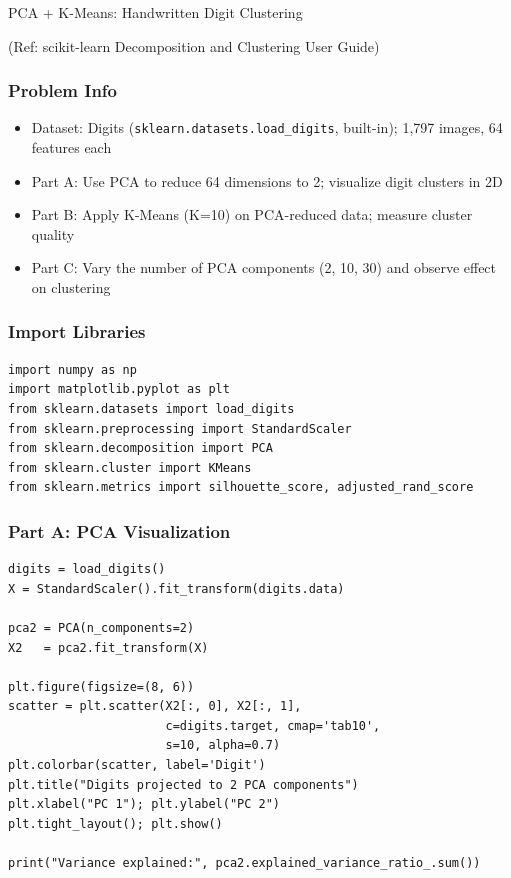 \begin{frame}[fragile]\frametitle{}
\begin{center}
{\Large PCA + K-Means: Handwritten Digit Clustering}

{\tiny (Ref: scikit-learn Decomposition and Clustering User Guide)}
\end{center}
\end{frame}

\begin{frame}[fragile]\frametitle{Problem Info}
\begin{itemize}
\item Dataset: Digits (\texttt{sklearn.datasets.load\_digits}, built-in); 1,797 images, 64 features each
\item Part A: Use PCA to reduce 64 dimensions to 2; visualize digit clusters in 2D
\item Part B: Apply K-Means (K=10) on PCA-reduced data; measure cluster quality
\item Part C: Vary the number of PCA components (2, 10, 30) and observe effect on clustering
\end{itemize}
\end{frame}

\begin{frame}[fragile]\frametitle{Import Libraries}
\begin{lstlisting}
import numpy as np
import matplotlib.pyplot as plt
from sklearn.datasets import load_digits
from sklearn.preprocessing import StandardScaler
from sklearn.decomposition import PCA
from sklearn.cluster import KMeans
from sklearn.metrics import silhouette_score, adjusted_rand_score
\end{lstlisting}
\end{frame}

\begin{frame}[fragile]\frametitle{Part A: PCA Visualization}
\begin{lstlisting}
digits = load_digits()
X = StandardScaler().fit_transform(digits.data)

pca2 = PCA(n_components=2)
X2   = pca2.fit_transform(X)

plt.figure(figsize=(8, 6))
scatter = plt.scatter(X2[:, 0], X2[:, 1],
                      c=digits.target, cmap='tab10',
                      s=10, alpha=0.7)
plt.colorbar(scatter, label='Digit')
plt.title("Digits projected to 2 PCA components")
plt.xlabel("PC 1"); plt.ylabel("PC 2")
plt.tight_layout(); plt.show()

print("Variance explained:", pca2.explained_variance_ratio_.sum())
\end{lstlisting}
\end{frame}

